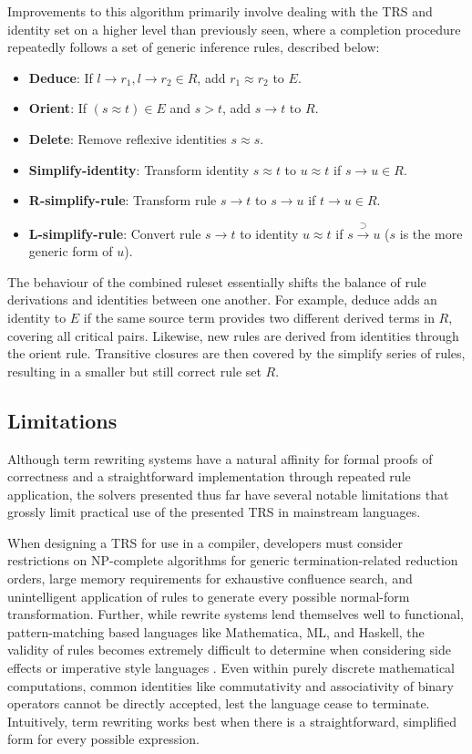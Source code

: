 \documentclass{article}
\begin{document}
Improvements to this algorithm primarily involve dealing with the TRS and identity set on a higher level than previously seen, where a completion procedure
repeatedly follows a set of generic inference rules, described below:
\begin{itemize}
    \item \textbf{Deduce}: If $l \rightarrow r_1, l \rightarrow r_2 \in R$, add $r_1 \approx r_2$ to $E$.
    \item \textbf{Orient}: If $(s \approx t) \in E$ and $s > t$, add $s \rightarrow t$ to $R$.
    \item \textbf{Delete}: Remove reflexive identities $s \approx s$.
    \item \textbf{Simplify-identity}: Transform identity $s \approx t$ to $u \approx t$ if $s \rightarrow u \in R$.
    \item \textbf{R-simplify-rule}: Transform rule $s \rightarrow t$ to $s \rightarrow u$ if $t \rightarrow u \in R$.
    \item \textbf{L-simplify-rule}: Convert rule $s \rightarrow t$ to identity $u \approx t$ if $s \xrightarrow{\supset} u$ ($s$ is the more generic form of $u$).
\end{itemize}
The behaviour of the combined ruleset essentially shifts the balance of rule derivations and identities between one another. For example, deduce adds an identity
to $E$ if the same source term provides two different derived terms in $R$, covering all critical pairs.
Likewise, new rules are derived from identities through the orient rule.
Transitive closures are then covered by the simplify series of rules, resulting in a smaller but still correct rule set $R$.

\subsection{Limitations}
Although term rewriting systems have a natural affinity for formal proofs of correctness
and a straightforward implementation through repeated rule application,
the solvers presented thus far have several notable limitations that grossly limit practical use of the presented TRS in mainstream languages.

When designing a TRS for use in a compiler, developers must consider restrictions on
NP-complete algorithms for generic termination-related reduction orders, large memory requirements for exhaustive confluence search,
and unintelligent application of rules to generate every possible normal-form transformation.
Further, while rewrite systems lend themselves well to functional, pattern-matching based languages like Mathematica, ML, and Haskell,
the validity of rules becomes extremely difficult to determine when considering side effects or imperative style languages \cite{elco1998building}.
Even within purely discrete mathematical computations, common identities like commutativity and associativity of binary operators
cannot be directly accepted, lest the language cease to terminate. Intuitively, term rewriting works best when there is a straightforward,
simplified form for every possible expression.
\end{document}

